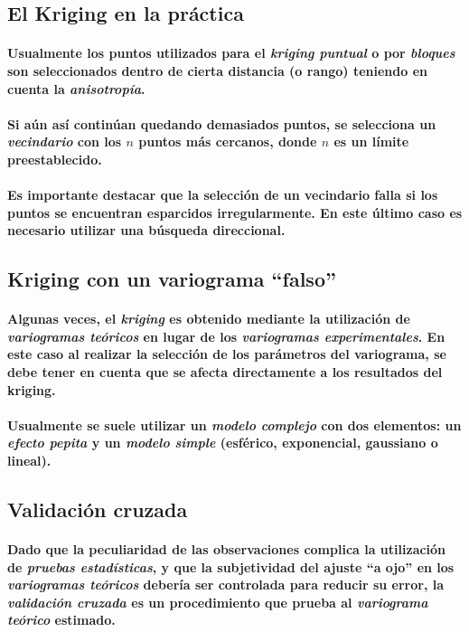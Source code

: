\subsection{El Kriging en la práctica}
\paragraph{
Usualmente los puntos utilizados para el \emph{kriging puntual} o por \emph{bloques} son seleccionados dentro de cierta distancia (o rango) teniendo en cuenta la \emph{anisotropía}.
}
\paragraph{
Si aún así continúan quedando demasiados puntos, se selecciona un \emph{vecindario} con los $n$ puntos más cercanos, donde $n$ es un límite preestablecido.
}
\paragraph{
Es importante destacar que la selección de un vecindario falla si los puntos se encuentran esparcidos irregularmente. En este último caso es necesario utilizar una búsqueda direccional.
}


\subsection{Kriging con un variograma ``falso''}
\paragraph{
Algunas veces, el \emph{kriging} es obtenido mediante la utilización de \emph{variogramas teóricos} en lugar de los \emph{variogramas experimentales}. En este caso al realizar la selección de los parámetros del variograma, se debe tener en cuenta que se afecta directamente a los resultados del kriging.
}
\paragraph{
Usualmente se suele utilizar un \emph{modelo complejo} con dos elementos: un \emph{efecto pepita} y un \emph{modelo simple} (esférico, exponencial, gaussiano o lineal).
}


\subsection{Validación cruzada}
\paragraph{
Dado que la peculiaridad de las observaciones complica la utilización de \emph{pruebas estadísticas}, y que la subjetividad del ajuste ``a ojo'' en los \emph{variogramas teóricos} debería ser controlada para reducir su error, la \emph{validación cruzada} es un procedimiento que prueba al \emph{variograma teórico} estimado.
}

